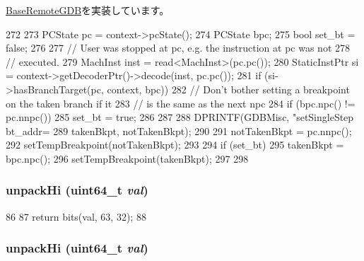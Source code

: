 \hyperlink{classBaseRemoteGDB_a253d4b1107e84fe80036d1826067741a}{BaseRemoteGDB}を実装しています。


\begin{DoxyCode}
272 {
273     PCState pc = context->pcState();
274     PCState bpc;
275     bool set_bt = false;
276 
277     // User was stopped at pc, e.g. the instruction at pc was not
278     // executed.
279     MachInst inst = read<MachInst>(pc.pc());
280     StaticInstPtr si = context->getDecoderPtr()->decode(inst, pc.pc());
281     if (si->hasBranchTarget(pc, context, bpc)) {
282         // Don't bother setting a breakpoint on the taken branch if it
283         // is the same as the next npc
284         if (bpc.npc() != pc.nnpc())
285             set_bt = true;
286     }
287 
288     DPRINTF(GDBMisc, "setSingleStep bt_addr=%
289             takenBkpt, notTakenBkpt);
290 
291     notTakenBkpt = pc.nnpc();
292     setTempBreakpoint(notTakenBkpt);
293 
294     if (set_bt) {
295         takenBkpt = bpc.npc();
296         setTempBreakpoint(takenBkpt);
297     }
298 }
\end{DoxyCode}
\hypertarget{classMipsISA_1_1RemoteGDB_a00ef221030b6ba76f5bad6e8b1e8cd82}{
\subsubsection[{unpackHi}]{ unpackHi (uint64\_\-t {\em val})}}
\label{classMipsISA_1_1RemoteGDB_a00ef221030b6ba76f5bad6e8b1e8cd82}



\begin{DoxyCode}
86         {
87             return bits(val, 63, 32);
88         }
\end{DoxyCode}
\hypertarget{classMipsISA_1_1RemoteGDB_a00ef221030b6ba76f5bad6e8b1e8cd82}{
\subsubsection[{unpackHi}]{ unpackHi (uint64\_\-t {\em val})}}
\label{classMipsISA_1_1RemoteGDB_a00ef221030b6ba76f5bad6e8b1e8cd82}



